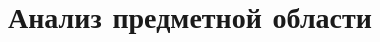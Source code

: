\documentclass[../main]{subfiles}
\begin{document}



\newpage
\section{Анализ предметной области}
\end{document}
